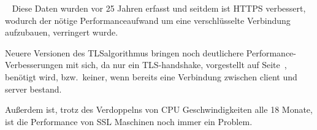 \begin{table}[htpb]
    \caption[Parameter linearer Anpassungen an HTTP- und HTTPS-Übertragungen]{Parameter linearer Anpassungen an HTTP- und HTTPS-Übertragungen\footnotemark}
    \label{tab:HTTPS}
\end{table}~
Diese Daten wurden vor 25 Jahren erfasst und seitdem ist \ac{HTTPS} verbessert, wodurch der nötige Performanceaufwand um eine verschlüsselte Verbindung aufzubauen, verringert wurde.\autocite[\vglf][]{CloudfareWarumHTTPS:online}

Neuere Versionen des \ac{TLS}\nonbreakdash \gls{algorithmus} bringen noch deutlichere Performance-Verbesserungen mit sich, da \uam nur ein \ac{TLS}-\gls{handshake}, vorgestellt auf Seite\ \pageref{par:tls_handshake_protocol}, benötigt wird, bzw.\ keiner, wenn bereits eine Verbindung zwischen \gls{client} und \gls{server} bestand\autocite[\vglf][]{CloudfareWarumHTTPS:online}.

Außerdem ist, trotz des Verdoppelns von CPU Geschwindigkeiten alle 18 Monate, ist die Performance von \ac{SSL} Maschinen noch immer ein Problem.\autocite[\vglf][]{cryptoeprint:2006/212}

